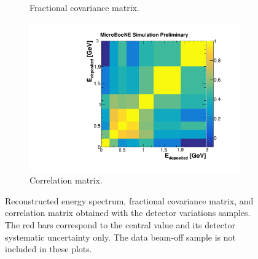 \begin{figure}[htbp]
\begin{center}
\begin{subfigure}{0.49\textwidth}
      \caption{Fractional covariance matrix.}  \label{fig:frac_det}
    \end{subfigure}
    \begin{subfigure}{0.49\textwidth}
      \includegraphics[width=\linewidth]{figures/corr_det.pdf}
      \caption{Correlation matrix.}  \label{fig:corr_det}
    \end{subfigure}
    \caption{Reconstructed energy spectrum, fractional covariance matrix, and correlation matrix obtained with the detector variations samples. The red bars correspond to the central value and its detector systematic uncertainty only. The data beam-off sample is not included in these plots.} \label{fig:det_sys}
	\end{center}
\end{figure}



